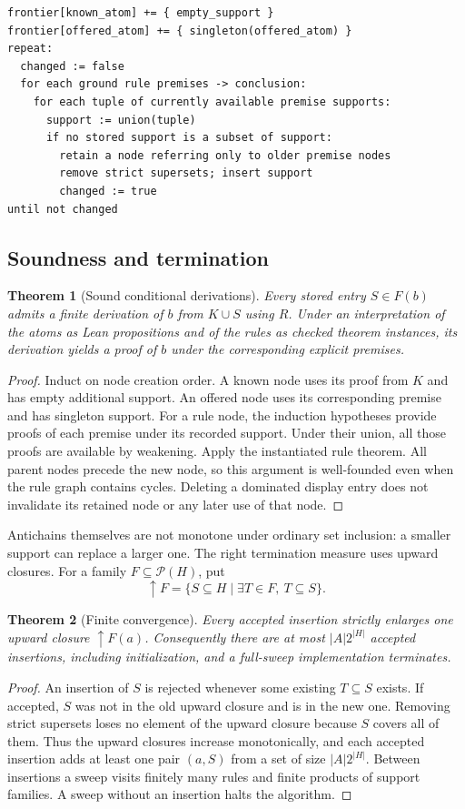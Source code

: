 \documentclass[11pt,a4paper]{article}
\newtheorem{theorem}{Theorem}[section]
\theoremstyle{definition}\newtheorem{definition}[theorem]{Definition}
\theoremstyle{remark}\newtheorem{remark}[theorem]{Remark}
\begin{document}
\begin{lstlisting}
frontier[known_atom] += { empty_support }
frontier[offered_atom] += { singleton(offered_atom) }
repeat:
  changed := false
  for each ground rule premises -> conclusion:
    for each tuple of currently available premise supports:
      support := union(tuple)
      if no stored support is a subset of support:
        retain a node referring only to older premise nodes
        remove strict supersets; insert support
        changed := true
until not changed
\end{lstlisting}

\subsection{Soundness and termination}
\begin{theorem}[Sound conditional derivations]\label{thm:sound}
Every stored entry $S\in F(b)$ admits a finite derivation of $b$ from $K\cup S$ using $R$. Under an interpretation of the atoms as Lean propositions and of the rules as checked theorem instances, its derivation yields a proof of $b$ under the corresponding explicit premises.
\end{theorem}
\begin{proof}
Induct on node creation order. A known node uses its proof from $K$ and has empty additional support. An offered node uses its corresponding premise and has singleton support. For a rule node, the induction hypotheses provide proofs of each premise under its recorded support. Under their union, all those proofs are available by weakening. Apply the instantiated rule theorem. All parent nodes precede the new node, so this argument is well-founded even when the rule graph contains cycles. Deleting a dominated display entry does not invalidate its retained node or any later use of that node.
\end{proof}

Antichains themselves are not monotone under ordinary set inclusion: a smaller support can replace a larger one. The right termination measure uses upward closures. For a family $F\subseteq\mathcal P(H)$, put
\[
 \uparrow F=\{S\subseteq H\mid\exists T\in F,\ T\subseteq S\}.
\]
\begin{theorem}[Finite convergence]\label{thm:terminate}
Every accepted insertion strictly enlarges one upward closure $\uparrow F(a)$. Consequently there are at most $|A|2^{|H|}$ accepted insertions, including initialization, and a full-sweep implementation terminates.
\end{theorem}
\begin{proof}
An insertion of $S$ is rejected whenever some existing $T\subseteq S$ exists. If accepted, $S$ was not in the old upward closure and is in the new one. Removing strict supersets loses no element of the upward closure because $S$ covers all of them. Thus the upward closures increase monotonically, and each accepted insertion adds at least one pair $(a,S)$ from a set of size $|A|2^{|H|}$. Between insertions a sweep visits finitely many rules and finite products of support families. A sweep without an insertion halts the algorithm.
\end{proof}
\end{document}
